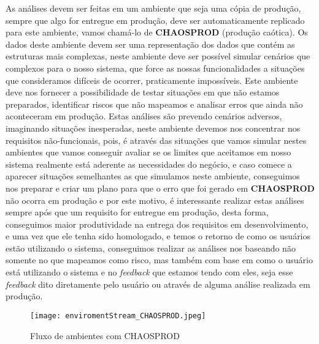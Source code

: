       As análises devem ser feitas em um ambiente que seja uma cópia de produção,
      sempre que algo for entregue em produção, deve ser automaticamente replicado
      para este ambiente, vamos chamá-lo de \textbf{CHAOSPROD} (produção caótica).
      Os dados deste ambiente devem ser uma representação dos dados que contém
      as estruturas mais complexas, neste ambiente deve ser possível simular
      cenários que complexos para o nosso sistema, que force as nossas funcionalidades
      a situações que consideramos difíceis de ocorrer, praticamente impossíveis.
      Este ambiente deve nos fornecer a possibilidade de testar situações em que
      não estamos preparados, identificar riscos que não mapeamos e analisar erros
      que ainda não aconteceram em produção. \newline
      Estas análises são prevendo cenários adversos, imaginando situações inesperadas,
      neste ambiente devemos nos concentrar nos requisitos não-funcionais, pois,
      é através das situações que vamos simular nestes ambientes que vamos conseguir
      avaliar se os limites que aceitamos em nosso sistema realmente está aderente
      as necessidades do negócio, e caso comece a aparecer situações semelhantes
      as que simulamos neste ambiente, conseguimos nos preparar
      e criar um plano para que o erro que foi gerado em \textbf{CHAOSPROD} não
      ocorra em produção e por este motivo, é interessante realizar estas análises
      sempre após que um requisito for entregue em produção, desta forma, conseguimos
      maior produtividade na entrega dos requisitos em desenvolvimento, e uma vez
      que ele tenha sido homologado, e temos o retorno de como os usuários estão
      utilizando o sistema, conseguimos realizar as análises nos baseando não somente
      no que mapeamos como risco, mas também com base em como o usuário está
      utilizando o sistema e no \textit{feedback} que estamos tendo com eles,
      seja esse \textit{feedback} dito diretamente pelo usuário ou através de
      alguma análise realizada em produção.

      \begin{figure}[!h]
        \centering
        \texttt{[image: enviromentStream\_CHAOSPROD.jpeg]}
        \caption{Fluxo de ambientes com CHAOSPROD}
        \label{Imagem:3}
      \end{figure}

